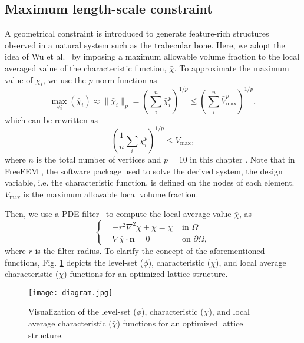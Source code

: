 \begin{subappendices}
\subsection{Maximum length-scale constraint}\label{Section: Maximum length-scale constraint}
A geometrical constraint is introduced to generate feature-rich structures observed in a natural system such as the trabecular bone. Here, we adopt the idea of Wu et al.\ \cite{wu2017infill} by imposing a maximum allowable volume fraction to the local averaged value of the characteristic function, $\bar{\chi}$. To approximate the maximum value of $\bar{\chi}_i$, we use the $p$-norm function as
\begin{equation} \label{eq:infill_vmax_1}
\max_{\forall i} \left(\bar{\chi}_i \right) \approx
\|\bar{\chi}_i \|_{p}=\left(\sum_i^n \bar{\chi}_{i}^{p}\right)^{1/p}
\leq \left( \sum_{i}^n \bar{V}_{\max}^p \right)^{1/p},
\end{equation}
which can be rewritten as
\begin{equation} \label{eq:infill_vmax_2}
\left(\dfrac{1}{n} \sum_{i} \bar{\chi}_{i}^{p}\right)^{1 / p} \leq \bar{V}_{\max },
\end{equation}
where $n$ is the total number of vertices and $p=10$ in this chapter \cite{li2021full}. Note that in FreeFEM \cite{Hecht2012}, the software package used to solve the derived system, the design variable, i.e. the characteristic function, is defined on the nodes of each element. $ \bar{V}_{\max }$ is the maximum allowable local volume fraction.

Then, we use a \gls{PDE}-filter\ \cite{lazarov2011filters,kawamoto2011heaviside} to compute the local average value $\bar{\chi}$, as
\begin{equation}
	\left\{\begin{aligned}
		& -r^2 \nabla^2 \bar{\chi} +  \bar{\chi} =  \chi & \text{ in } \Omega \\
		& \nabla \bar{\chi} \cdot \boldsymbol{n} = 0 & \text{ on } \partial \Omega,
	\end{aligned}\right.
	\label{Eq: pde filter}
\end{equation}
where $r$ is the filter radius. To clarify the concept of the aforementioned functions, Fig. \ref{fig:infill_diagram} depicts the level-set ($\phi$), characteristic ($\chi$), and local average characteristic ($\bar{\chi}$) functions for an optimized lattice structure.

\begin{figure}[h]
\centering
\medskip
\texttt{[image: diagram.jpg]}
\caption[Visualization of function used for topology optimization]{Visualization of the level-set ($\phi$), characteristic ($\chi$), and local average characteristic ($\bar{\chi}$) functions for an optimized lattice structure.} \label{fig:infill_diagram}
\end{figure}


\end{subappendices}
